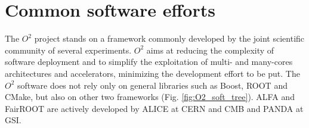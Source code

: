 
\section{Common software efforts}
The $O^2$ project stands on a framework commonly developed by the joint scientific community of several experiments.
$O^2$ aims at reducing the complexity of software deployment and to simplify the exploitation of multi- and many-cores architectures and accelerators, minimizing the development effort to be put.
The $O^2$ software does not rely only on general libraries such as Boost, ROOT and CMake, but also on other two frameworks (Fig. \ref{fig:O2_soft_tree}).
ALFA \cite{alfa} and FairROOT \cite{fairroot} are actively developed by ALICE at CERN and CMB and PANDA at GSI.

